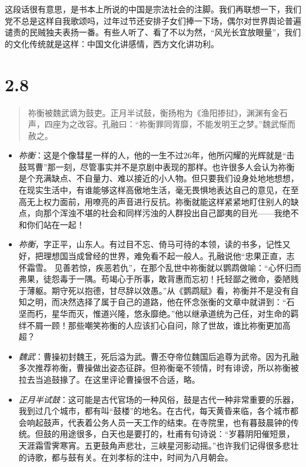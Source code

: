 \documentclass[]{book}
\providecommand{\tightlist}{%
  \setlength{\itemsep}{0pt}\setlength{\parskip}{0pt}}
\begin{document}
这段话很有意思，是书本上所说的中国是宗法社会的注脚。我们再联想一下，我们党不总是这样自我歌颂吗，过年过节还安排子女们捧一下场，偶尔对世界舆论普遍谴责的民贼独夫表扬一番。有些人听了、看了不以为然，``风光长宜放眼量''，我们的文化传统就是这样：中国文化讲感情，西方文化讲功利。

\section{2.8}\label{section-54}

\begin{quote}
祢衡被魏武谪为鼓吏。正月半试鼓，衡扬枹为《渔阳掺挝》，渊渊有金石声，四座为之改容。孔融曰：``祢衡罪同胥靡，不能发明王之梦。''魏武惭而赦之。
\end{quote}

\begin{itemize}
\tightlist
\item
  \emph{祢衡}：这是个像彗星一样的人，他的一生不过26年，他所闪耀的光辉就是``击鼓骂曹''那一刻，尽管事实并不是京剧中表现的那样。也许很多人会认为祢衡是个充满缺点、不自量力、难以接近的小人物。但只要我们设身处地地想想，在现实生活中，有谁能够这样高傲地生活，毫无畏惧地表达自己的意见，在至高无上权力面前，用嘹亮的声音进行反抗。祢衡就能这样紧紧地盯住别人的缺点，向那个浑浊不堪的社会和同样污浊的人群投出自己鄙夷的目光------我绝不和你们站在一起！
\item
  \emph{祢衡}，字正平，山东人。有过目不忘、倚马可待的本领，读的书多，记性又好，把理想国当成曾经的世界，难免看不起一般人。孔融说他``忠果正直，志怀霜雪。
  见善若惊，疾恶若仇''，在那个乱世中祢衡就以鹦鹉做喻：``心怀归而弗果，徒怨毒于一隅。苟竭心于所事，敢背惠而忘初！托轻鄙之微命，委陋贱于薄躯。期守死以抱德，甘尽辞以效愚。''从《鹦鹉赋》看，祢衡并不是没有自知之明，而决然选择了属于自己的道路，他在怀念张衡的文章中就讲到：``石坚而朽，星华而灭，惟道兴隆，悠永靡绝。''他以继承道统为己任，对生命的羁绊不屑一顾！那些嘲笑祢衡的人应该扪心自问，除了世故，谁比祢衡更加高超？
\item
  \emph{魏武}：曹操初封魏王，死后溢为武。曹丕夺帝位魏国后追尊为武帝。因为孔融多次推荐祢衡，曹操做出姿态征辟。但祢衡毫不领情，时有诽谤，所以祢衡被拉去当追鼓掾了。在这里评论曹操很不合适，略。
\item
  \emph{正月半试鼓}：这可能是古代官场的一种风俗，鼓是古代一种非常重要的乐器，我到过几个城市，都有叫``鼓楼''的地名。在古代，每天黄昏来临，各个城市都会响起鼓声，代表着公务人员一天工作的结束。在寺院里，也有暮鼓晨钟的传统。但鼓的用途很多，白天也是要打的，杜甫有句诗说：``岁暮阴阳催短景，天涯霜雪霁寒宵。五更鼓角声悲壮，三峡星河影动摇。''也许我们记得很多悲壮的诗歌，都与鼓有关。在刘孝标的注中，时间为八月朝会。

\end{itemize}
\end{document}
